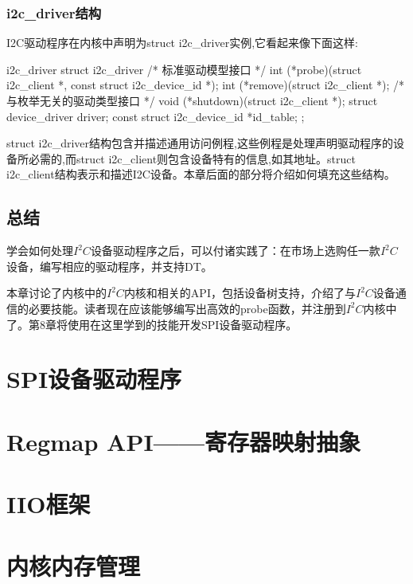 \documentclass[lang=cn,newtx,10pt,scheme=chinese]{elegantbook}
\begin{document}
\subsection{i2c\_driver结构}

I2C驱动程序在内核中声明为struct i2c\_driver实例,它看起来像下面这样:

\begin{mycode}{i2c\_driver}
struct i2c_driver {
    /* 标准驱动模型接口 */
    int (*probe)(struct i2c_client *, const struct i2c_device_id *);
    int (*remove)(struct i2c_client *);
    /* 与枚举无关的驱动类型接口 */
    void (*shutdown)(struct i2c_client *);
    struct device_driver driver;
    const struct i2c_device_id *id_table;
};
\end{mycode}

struct i2c\_driver结构包含并描述通用访问例程,这些例程是处理声明驱动程序的设备所必需的,而struct i2c\_client则包含设备特有的信息,如其地址。struct i2c\_client结构表示和描述I2C设备。本章后面的部分将介绍如何填充这些结构。



\section{总结}

学会如何处理$I^2C$设备驱动程序之后，可以付诸实践了：在市场上选购任一款$I^2C$设备，编写相应的驱动程序，并支持DT。

本章讨论了内核中的$I^2C$内核和相关的API，包括设备树支持，介绍了与$I^2C$设备通信的必要技能。读者现在应该能够编写出高效的probe函数，并注册到$I^2C$内核中了。第8章将使用在这里学到的技能开发SPI设备驱动程序。

\chapter{SPI设备驱动程序}

\chapter{Regmap API——寄存器映射抽象}

\chapter{IIO框架}

\chapter{内核内存管理}
\end{document}
